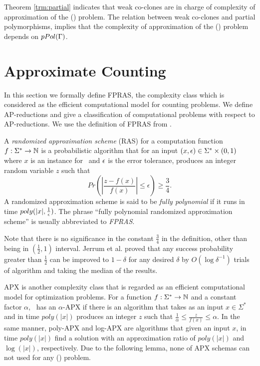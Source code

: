 Theorem \ref{trm:partial} indicates that weak co-clones are
in charge of complexity of approximation of the \ccsp(\mrelset) problem.
The relation between weak co-clones and partial polymorphisms,
implies that the complexity of approximation of the \ccsp(\mrelset) problem 
depends on \(pPol(\Gamma)\)\@.

\chapter{Approximate Counting}
In this section we formally define FPRAS, the complexity class which
is considered as the efficient computational model for counting problems.
We define AP-reductions and give a classification of computational problems 
with respect to AP-reductions. We use the definition of FPRAS from \cite{counting}\@. 

A \emph{randomized approximation scheme} (RAS) for a computation function \(f:\Sigma^*\to\mathbb{N}\)
is a probabilistic algorithm that for an input \((x,\epsilon)\in\Sigma^*\times(0,1)\) 
where \(x\) is an instance for \mf\ and \(\epsilon\) is the error tolerance, 
produces an integer random variable \(z\) such that 
\[Pr\left(\left|\frac{z-f(x)}{f(x)}\right|\le \epsilon\right) \ge \frac{3}{4}.\]
A randomized approximation scheme is said to be \emph{fully polynomial} if it runs in time \(poly(|x|,\frac{1}{\epsilon})\)\@. 
The phrase ``fully polynomial randomized approximation scheme'' is usually abbreviated to 
\emph{FPRAS}\@. 

Note that there is no significance in the constant \(\frac{3}{4}\) in the definition,
other than being in \((\frac{1}{2},1)\) interval. 
Jerrum et al. \cite{JVV} proved that any success probability 
greater than \(\frac{1}{2}\) can be improved to \(1-\delta\) for any desired \(\delta\) by
\(O(\log \delta^{-1})\) trials of algorithm and taking the median of the results.

APX is another complexity class that is regarded as an efficient computational model for
optimization problems.
For a function \(f:\Sigma^*\to\mathbb{N}\) and a constant factor \(\alpha\),
\mf\ has an \(\alpha\)-APX if there is an algorithm that
takes as an input \(x\in\Sigma^*\) and in time \(poly(|x|)\) produces an integer \(z\)
such that \(\frac{1}{\alpha}\le\frac{z}{f(x)}\le \alpha\). In the same manner,
poly-APX and log-APX are algorithms that given an input
\(x\), in time \(poly(|x|)\) find a solution with an approximation ratio of \(poly(|x|)\)
and \(\log(|x|)\), respectively. Due to the following lemma, none of APX schemas can not
used for any \ccsp(\mrelset) problem.

